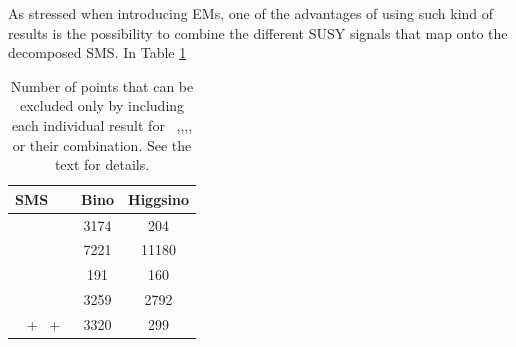 \documentclass[epj,nopacs,fleqn]{svjour}
\begin{document}
\fi
As stressed when introducing EMs, one of the advantages of using such kind of results is the possibility to combine the different SUSY signals that map onto the decomposed SMS. In Table \ref{breakdown_number} 
\begin{table}[b]
	\footnotesize
	\begin{center}
		\renewcommand{\arraystretch}{1.3}
		\begin{tabular}{ l c c }  \toprule \toprule
		\textbf{SMS} & \textbf{Bino} & \textbf{Higgsino} \\  \toprule
		\Tone~ & 3174 & 204   \\
		\Ttwo~ & 7221 & 11180 \\
		\Tfive~ & 191 & 160  \\
		\TGQ~ & 3259 & 2792  \\
		\Ttwo~ +\Tfive~ +\TGQ~ & 3320 & 299 \\
		\bottomrule \bottomrule 
		\end{tabular}
	\end{center}
	\caption{Number of points that can be excluded only by including each individual result for \Tone~,\Ttwo,\Tfive,\TGQ, or their combination. See the text for details.}
	\label{breakdown_number} 
\end{table}
\end{document}
